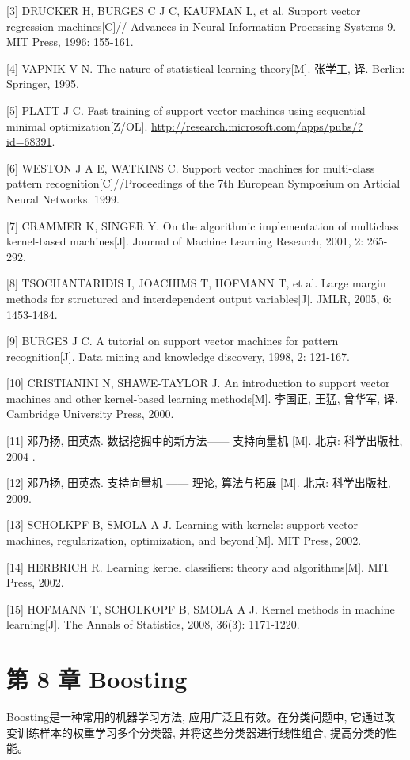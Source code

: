 \documentclass[10pt]{article}
\begin{document}
[3] DRUCKER H, BURGES C J C, KAUFMAN L, et al. Support vector regression machines[C]// Advances in Neural Information Processing Systems 9. MIT Press, 1996: 155-161.

[4] VAPNIK V N. The nature of statistical learning theory[M]. 张学工, 译. Berlin: Springer, 1995.

[5] PLATT J C. Fast training of support vector machines using sequential minimal optimization[Z/OL]. \href{http://research.microsoft.com/apps/pubs/?id=68391}{http://research.microsoft.com/apps/pubs/?id=68391}.

[6] WESTON J A E, WATKINS C. Support vector machines for multi-class pattern recognition[C]//Proceedings of the 7th European Symposium on Articial Neural Networks. 1999.

[7] CRAMMER K, SINGER Y. On the algorithmic implementation of multiclass kernel-based machines[J]. Journal of Machine Learning Research, 2001, 2: 265-292.

[8] TSOCHANTARIDIS I, JOACHIMS T, HOFMANN T, et al. Large margin methods for structured and interdependent output variables[J]. JMLR, 2005, 6: 1453-1484.

[9] BURGES J C. A tutorial on support vector machines for pattern recognition[J]. Data mining and knowledge discovery, 1998, 2: 121-167.

[10] CRISTIANINI N, SHAWE-TAYLOR J. An introduction to support vector machines and other kernel-based learning methods[M]. 李国正, 王猛, 曾华军, 译. Cambridge University Press, 2000.

[11] 邓乃扬, 田英杰. 数据挖掘中的新方法—— 支持向量机 [M]. 北京: 科学出版社, 2004 .

[12] 邓乃扬, 田英杰. 支持向量机 —— 理论, 算法与拓展 [M]. 北京: 科学出版社, 2009.

[13] SCHOLKPF B, SMOLA A J. Learning with kernels: support vector machines, regularization, optimization, and beyond[M]. MIT Press, 2002.

[14] HERBRICH R. Learning kernel classifiers: theory and algorithms[M]. MIT Press, 2002.

[15] HOFMANN T, SCHOLKOPF B, SMOLA A J. Kernel methods in machine learning[J]. The Annals of Statistics, 2008, 36(3): 1171-1220.

\section*{第 8 章 Boosting}
Boosting是一种常用的机器学习方法, 应用广泛且有效。在分类问题中, 它通过改变训练样本的权重学习多个分类器, 并将这些分类器进行线性组合, 提高分类的性能。
\end{document}
